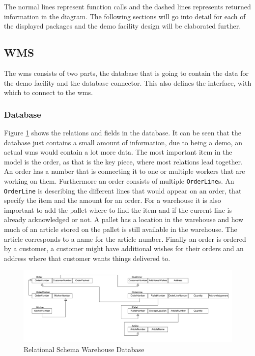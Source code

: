 The normal lines represent function calls and the dashed lines represents returned information in the diagram. The following sections will go into detail for each of the displayed packages and the demo facility design will be elaborated further.


\subsection{WMS}
The \acrlong{wms} consists of two parts, the database that is going to contain the data for the demo facility and the database connector. This also defines the interface, with which to connect to the \gls{wms}.

\subsubsection{Database}

Figure \ref{fig:LogicalModelWMS} shows the relations and fields in the database. It can be seen that the database just contains a small amount of information, due to being a demo, an actual \gls{wms} would contain a lot more data. The most important item in the model is the order, as that is the key piece, where most relations lead together. An order has a number that is connecting it to one or multiple workers that are working on them. Furthermore an order consists of multiple \texttt{OrderLine}s. An \texttt{OrderLine} is describing the different lines that would appear on an order, that specify the item and the amount for an order. For a warehouse it is also important to add the pallet where to find the item and if the current line is already acknowledged or not. A pallet has a location in the warehouse and how much of an article stored on the pallet is still available in the warehouse. The article corresponds to a name for the article number. Finally an order is ordered by a customer, a customer might have additional wishes for their orders and an address where that customer wants things delivered to.

\begin{figure}[H]
	\includegraphics[width=\textwidth]{images/LogicalModel_MockWMS}
	\caption{Relational Schema Warehouse Database}
	\label{fig:LogicalModelWMS}
\end{figure}

